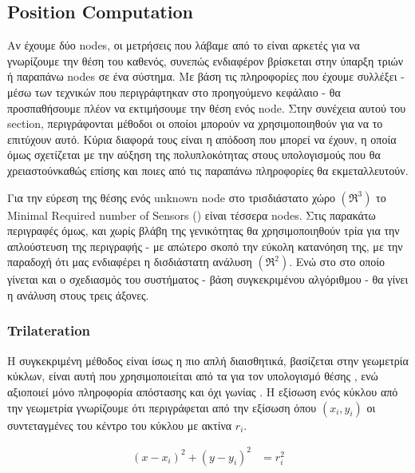 \subsection{Position Computation} \label{sec:Chapter3-2} 
Αν έχουμε δύο nodes, οι μετρήσεις που λάβαμε από το  είναι αρκετές για να γνωρίζουμε την θέση του καθενός,
συνεπώς ενδιαφέρον βρίσκεται στην ύπαρξη τριών ή παραπάνω nodes σε ένα σύστημα. Με βάση τις πληροφορίες που έχουμε συλλέξει - μέσω των τεχνικών που 
περιγράφτηκαν στο προηγούμενο κεφάλαιο - θα προσπαθήσουμε πλέον να εκτιμήσουμε την θέση ενός node. Στην συνέχεια αυτού του section, περιγράφονται μέθοδοι οι οποίοι μπορούν να χρησιμοποιηθούν για να το επιτύχουν
αυτό. Κύρια διαφορά τους είναι η απόδοση που μπορεί να έχουν, η οποία όμως σχετίζεται με την αύξηση της πολυπλοκότητας στους υπολογισμούς που θα
χρειαστούν\udot καθώς επίσης και ποιες από τις παραπάνω πληροφορίες θα εκμεταλλευτούν. 

Για την εύρεση της θέσης ενός unknown node στο τρισδιάστατο χώρο $(\mathfrak{R}^3)$ το Minimal Required number of Sensors () είναι τέσσερα nodes.
Στις παρακάτω περιγραφές όμως, και χωρίς βλάβη της γενικότητας θα χρησιμοποιηθούν τρία για την απλούστευση της περιγραφής - με απώτερο σκοπό την εύκολη κατανόηση της, με την παραδοχή ότι μας
ενδιαφέρει η δισδιάστατη ανάλυση $(\mathfrak{R}^2)$. Ενώ στο  στο οποίο γίνεται και ο σχεδιασμός του συστήματος - βάση συγκεκριμένου αλγόριθμου - 
θα γίνει η ανάλυση στους τρεις άξονες.

\subsubsection{Trilateration}
Η συγκεκριμένη μέθοδος είναι ίσως η πιο απλή διαισθητικά, βασίζεται στην γεωμετρία κύκλων, είναι αυτή που χρησιμοποιείται από τα 
για τον υπολογισμό θέσης \cite{trilateration-vs-triangulation-video}, ενώ αξιοποιεί μόνο πληροφορία απόστασης και όχι γωνίας \cite{Trilateration-vs-Triangulation}.
Η εξίσωση ενός κύκλου από την γεωμετρία γνωρίζουμε ότι περιγράφεται από την εξίσωση  όπου $(x_i,y_i)$ οι συντεταγμένες
του κέντρο του κύκλου με ακτίνα $r_i$.

\begin{align}
	(x-x_i)^2 + (y-y_i)^2 &= r_i^2 \label{eq:trilateration-circles}
\end{align}

